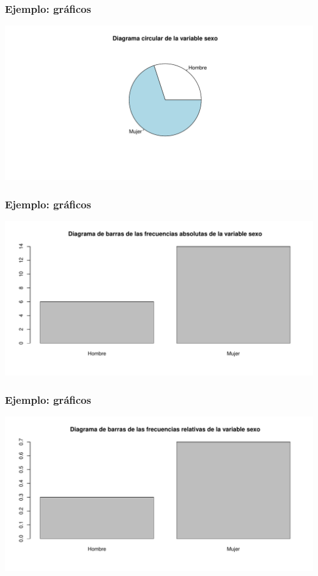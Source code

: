 \begin{frame}
\frametitle{Ejemplo: gráficos}
\begin{center}
\includegraphics{./dibujos/01/-001}
\end{center}
\end{frame}

\begin{frame}
\frametitle{Ejemplo: gráficos}
\begin{center}
\includegraphics{./dibujos/01/-002}
\end{center}
\end{frame}

\begin{frame}
\frametitle{Ejemplo: gráficos}
\begin{center}
\includegraphics{./dibujos/01/-003}
\end{center}
\end{frame}

